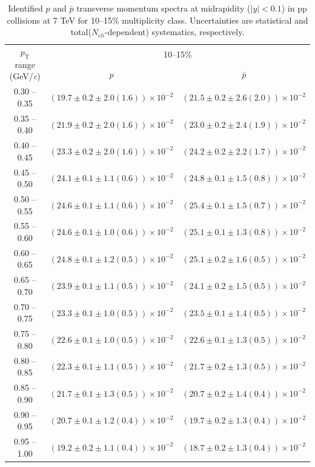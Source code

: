 \begin{table}
\caption{Identified $p$ and $\bar{p}$  transverse momentum spectra at midrapidity ($|y|<0.1$) in pp collisions at 7 TeV for 10--15\% multiplicity class. Uncertainties are statistical and total($N_{ch}$-dependent) systematics, respectively.}
\label{tab:ProtonPlus_ProtonMinus_10to15}
\begin{center}
\begin{tabular}{ c | c c }
\hline
\multirow{2}{*}{$p_{\mathrm{T}}$ range (GeV/\textit{c})} & \multicolumn{2}{c}{10--15\%} \\ & $p$& $\bar{p}$\\ 
\hline
0.30 -- 0.35 & $(19.7\pm0.2\pm2.0(1.6))\times10^{-2}$ & $(21.5\pm0.2\pm2.6(2.0))\times10^{-2}$ \\ 
0.35 -- 0.40 & $(21.9\pm0.2\pm2.0(1.6))\times10^{-2}$ & $(23.0\pm0.2\pm2.4(1.9))\times10^{-2}$ \\ 
0.40 -- 0.45 & $(23.3\pm0.2\pm2.0(1.6))\times10^{-2}$ & $(24.2\pm0.2\pm2.2(1.7))\times10^{-2}$ \\ 
0.45 -- 0.50 & $(24.1\pm0.1\pm1.1(0.6))\times10^{-2}$ & $(24.8\pm0.1\pm1.5(0.8))\times10^{-2}$ \\ 
0.50 -- 0.55 & $(24.6\pm0.1\pm1.1(0.6))\times10^{-2}$ & $(25.4\pm0.1\pm1.5(0.7))\times10^{-2}$ \\ 
0.55 -- 0.60 & $(24.6\pm0.1\pm1.0(0.6))\times10^{-2}$ & $(25.1\pm0.1\pm1.3(0.8))\times10^{-2}$ \\ 
0.60 -- 0.65 & $(24.8\pm0.1\pm1.2(0.5))\times10^{-2}$ & $(25.1\pm0.2\pm1.6(0.5))\times10^{-2}$ \\ 
0.65 -- 0.70 & $(23.9\pm0.1\pm1.1(0.5))\times10^{-2}$ & $(24.1\pm0.2\pm1.5(0.5))\times10^{-2}$ \\ 
0.70 -- 0.75 & $(23.3\pm0.1\pm1.0(0.5))\times10^{-2}$ & $(23.5\pm0.1\pm1.4(0.5))\times10^{-2}$ \\ 
0.75 -- 0.80 & $(22.6\pm0.1\pm1.0(0.5))\times10^{-2}$ & $(22.6\pm0.1\pm1.3(0.5))\times10^{-2}$ \\ 
0.80 -- 0.85 & $(22.3\pm0.1\pm1.1(0.5))\times10^{-2}$ & $(21.7\pm0.2\pm1.3(0.5))\times10^{-2}$ \\ 
0.85 -- 0.90 & $(21.7\pm0.1\pm1.3(0.5))\times10^{-2}$ & $(20.7\pm0.2\pm1.4(0.4))\times10^{-2}$ \\ 
0.90 -- 0.95 & $(20.7\pm0.1\pm1.2(0.4))\times10^{-2}$ & $(19.7\pm0.2\pm1.3(0.4))\times10^{-2}$ \\ 
0.95 -- 1.00 & $(19.2\pm0.2\pm1.1(0.4))\times10^{-2}$ & $(18.7\pm0.2\pm1.3(0.4))\times10^{-2}$ \\ 

\end{tabular}
\end{center}
\end{table}
